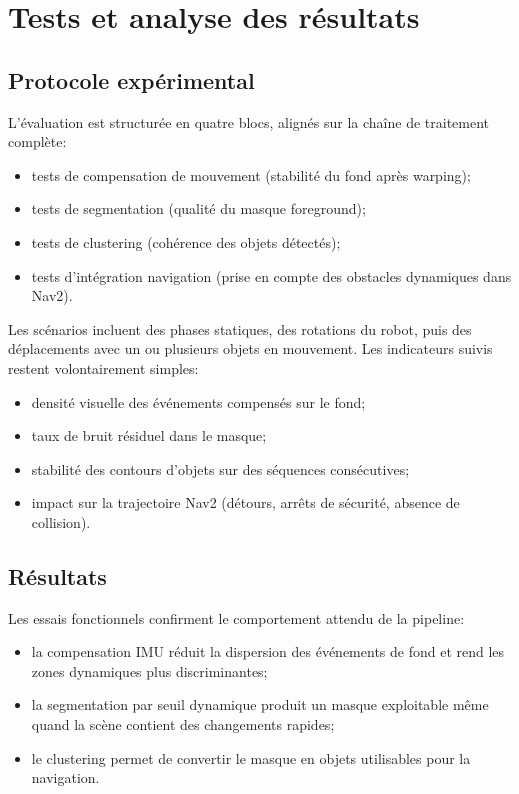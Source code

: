 \chapter{Tests et analyse des résultats}

\section{Protocole expérimental}
L'évaluation est structurée en quatre blocs, alignés sur la chaîne de
traitement complète:
\begin{itemize}
\item tests de compensation de mouvement (stabilité du fond après warping);
\item tests de segmentation (qualité du masque foreground);
\item tests de clustering (cohérence des objets détectés);
\item tests d'intégration navigation (prise en compte des obstacles dynamiques
dans Nav2).
\end{itemize}

Les scénarios incluent des phases statiques, des rotations du robot, puis des
déplacements avec un ou plusieurs objets en mouvement. Les indicateurs suivis
restent volontairement simples:
\begin{itemize}
\item densité visuelle des événements compensés sur le fond;
\item taux de bruit résiduel dans le masque;
\item stabilité des contours d'objets sur des séquences consécutives;
\item impact sur la trajectoire Nav2 (détours, arrêts de sécurité, absence de
collision).
\end{itemize}

\section{Résultats}
Les essais fonctionnels confirment le comportement attendu de la pipeline:
\begin{itemize}
\item la compensation IMU réduit la dispersion des événements de fond et rend
les zones dynamiques plus discriminantes;
\item la segmentation par seuil dynamique produit un masque exploitable même
quand la scène contient des changements rapides;
\item le clustering permet de convertir le masque en objets utilisables pour la
navigation.
\end{itemize}

